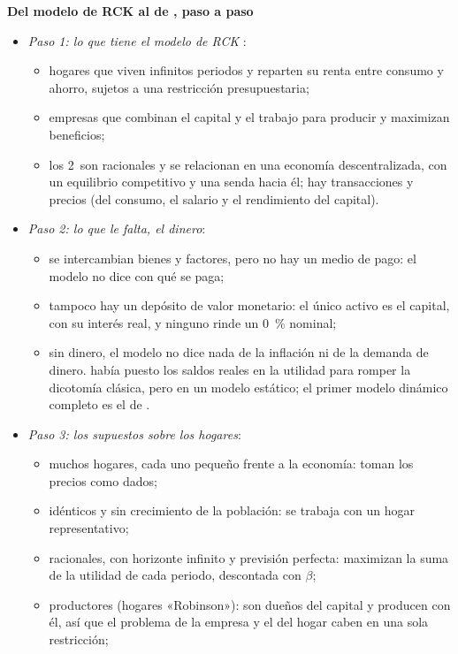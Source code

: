 \documentclass[11pt]{article}
\begin{document}
\begin{anotaciones}
\textbf{Del modelo de RCK al de , paso a paso}
\begin{itemize}
\item \emph{Paso 1: lo que tiene el modelo de RCK} :
  \begin{itemize}
  \item hogares que viven infinitos periodos y reparten su renta entre consumo y ahorro, sujetos a una restricción presupuestaria;
  \item empresas que combinan el capital y el trabajo para producir y maximizan beneficios;
  \item los 2~son racionales y se relacionan en una economía descentralizada, con un equilibrio competitivo y una senda hacia él; hay transacciones y precios (del consumo, el salario y el rendimiento del capital).
  \end{itemize}
\item \emph{Paso 2: lo que le falta, el dinero}:
  \begin{itemize}
  \item se intercambian bienes y factores, pero no hay un medio de pago: el modelo no dice con qué se paga;
  \item tampoco hay un depósito de valor monetario: el único activo es el capital, con su interés real, y ninguno rinde un 0~\% nominal;
  \item sin dinero, el modelo no dice nada de la inflación ni de la demanda de dinero. \textcite{Patinkin1956Money} había puesto los saldos reales en la utilidad para romper la dicotomía clásica, pero en un modelo estático; el primer modelo dinámico completo es el de .
  \end{itemize}
\item \emph{Paso 3: los supuestos sobre los hogares}:
  \begin{itemize}
  \item muchos hogares, cada uno pequeño frente a la economía: toman los precios como dados;
  \item idénticos y sin crecimiento de la población: se trabaja con un hogar representativo;
  \item racionales, con horizonte infinito y previsión perfecta: maximizan la suma de la utilidad de cada periodo, descontada con $\beta$;
  \item productores (hogares «Robinson»): son dueños del capital y producen con él, así que el problema de la empresa y el del hogar caben en una sola restricción;

\end{itemize}
\end{itemize}
\end{anotaciones}
\end{document}
